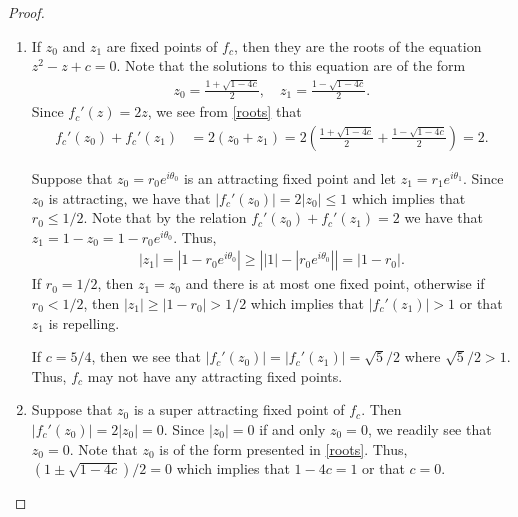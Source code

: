 \begin{proof}
  \begin{enumerate}
    \item If $z_0$ and $z_1$ are fixed points of $f_c$, then they are the roots
      of the equation $z^2 -z + c = 0$. Note that the solutions to this equation are of the
      form
      \begin{align}\label{roots}
        z_0 = \frac{1 + \sqrt{1-4c}}{2}, \quad z_1 = \frac{1 - \sqrt{1-4c}}{2}.
      \end{align}
      Since $f_c'(z) = 2z$, we see from \eqref{roots} that
      \begin{align*}
        f_c'(z_0) + f_c'(z_1) &= 2(z_0 + z_1) = 2\left(\frac{1 + \sqrt{1-4c}}{2} + \frac{1 - \sqrt{1-4c}}{2}\right) = 2.
      \end{align*}

      Suppose that $z_0 = r_0 e^{i \theta_0}$ is an attracting fixed point and
      let $z_1 = r_1 e^{i \theta_1}$. Since $z_0$ is attracting, we have that
      $\left|f_c'(z_0)\right| = 2 |z_0| \leq 1$ which implies that $r_0 \leq 1/2$.
      Note that by the relation $f_c'(z_0) + f_c'(z_1) = 2$ we have that $z_1 = 1 - z_0 = 1 - r_0 e^{i\theta_0}$.
      Thus,
      \begin{align*}
        |z_1| = \left|1 - r_0 e^{i\theta_0}\right| \geq \left||1| - \left|r_0 e^{i\theta_0}\right| \right| = |1 - r_0|.
      \end{align*}
      If $r_0 = 1/2$, then $z_1 = z_0$ and there is at most one fixed point, otherwise if $r_0 < 1/2$,
      then $|z_1| \geq |1 - r_0| > 1/2$ which implies that $\left|f_c'(z_1)\right| > 1$
      or that $z_1$ is repelling.

      If $c = 5/4$, then we see that $|f_c'(z_0)| = |f_c'(z_1)| = \sqrt{5}/2$ where $\sqrt{5}/2 > 1$. Thus, $f_c$
      may not have any attracting fixed points.

    \item Suppose that $z_0$ is a super attracting fixed point of $f_c$. Then $|f_c'(z_0)| = 2 |z_0| = 0$.
      Since $|z_0| = 0$ if and only $z_0 =0$, we readily see that $z_0 = 0$.
      Note that $z_0$ is of the form presented in \eqref{roots}. Thus,
      $(1 \pm \sqrt{1 - 4c})/2 = 0$ which implies that $1- 4c = 1$ or that $c=0$.


\end{enumerate}
\end{proof}
